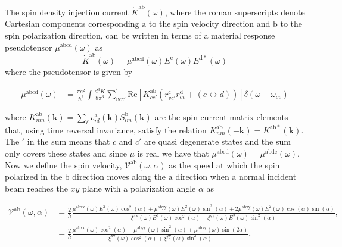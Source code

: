 \documentclass[prb,11pt,tightenlines,twocolumn,aps]{revtex4-1}
\begin{document}
The spin density injection current $\dot{K}^{\mathrm{ab}}(\omega)$, 
% 
{
\color{red}
where the roman superscripts denote Cartesian components corresponding
$\mathrm{a}$ to the spin velocity direction and $\mathrm{b}$ to the spin
polarization direction, can be written in terms of a material response
pseudotensor $\mu^{\mathrm{abcd}}(\omega)$ as }
\begin{equation*}
\dot{K}^{\mathrm{ab}}(\omega) = \mu^{\mathrm{abcd}}(\omega)
E^{\mathrm{c}}(\omega) E^{\mathrm{d*}}(\omega)
\label{eq:dotk}
\end{equation*}
where the pseudotensor is given by\cite{bhatPRL05}
\begin{widetext}
\begin{align}
\mu^{\mathrm{abcd}} (\omega) 
&=
\frac{\pi e^{2}}{\hbar^{2}} \int 
\frac{d^{3}K}{8 \pi^{3}}
\sum_{vcc'}^{'}
\mathrm{Re} \left[ K^{\mathrm{ab}}_{cc'} 
\left( 
r^{\mathrm{c}}_{vc'} 
r^{\mathrm{d}}_{cv } +
(c \leftrightarrow d)
\right) 
\right]
\delta(\omega-\omega_{cv})
\label{eq:mu}
\end{align}
\end{widetext}
{\color{red}
where $K^{\mathrm{ab}}_{mn}(\mathbf{k}) =
\sum_{\ell}v^{\mathrm{a}}_{nl}(\mathbf{k}) S^{\mathrm{b}}_{lm}(\mathbf{k})$ are
the spin current matrix elements that, using time reversal invariance, satisfy
the relation $K^{\mathrm{ab}}_{nm}(\mathbf{-k}) = K^{\mathrm{ab*}}(\mathbf{k})
$. 
}%
The $'$ in the sum means that $c$ and $c'$ are quasi degenerate states and
the sum only covers these states and 
{\color{red}
since $\mu$ is real we have that
$\mu^{\mathrm{abcd}}(\omega) = \mu^{\mathrm{abdc}}(\omega)$.
}
Now we define the spin velocity, $\mathcal{V}^{\mathrm{ab}}(\omega,\alpha)$ as
the speed at which the spin polarized in the $\mathrm{b}$   direction moves
along the $\mathrm{a}$ direction when a normal incident beam reaches the $xy$
plane with a polarization angle $\alpha$ as
\begin{widetext}
\begin{align}
\mathcal{V}^{\mathrm{ab}}(\omega,\alpha)
&= \frac{2}{\hbar}
\frac{\mu^{\mathrm{abxx}}(\omega)
E^{2}(\omega)\cos^{2}(\alpha) + 
\mu^{\mathrm{abyy}}(\omega)
E^{2}(\omega)\sin^{2}(\alpha) + 
2\mu^{\mathrm{abxy}}(\omega)
E^{2}(\omega)\cos(\alpha)\sin(\alpha)}
{\xi^{\mathrm{xx}}(\omega)
E^{2}(\omega)\cos^{2}(\alpha) + 
\xi^{\mathrm{yy}}(\omega)
E^{2}(\omega)\sin^{2}(\alpha)},
\nonumber \\
&= \frac{2}{\hbar}
\frac{\mu^{\mathrm{abxx}}(\omega)\cos^{2}(\alpha) + 
\mu^{\mathrm{abyy}}(\omega)\sin^{2}(\alpha) + 
\mu^{\mathrm{abxy}}(\omega)\sin(2\alpha)}
{\xi^{\mathrm{xx}}(\omega)\cos^{2}(\alpha) + 
\xi^{\mathrm{yy}}(\omega)\sin^{2}(\alpha)},
\label{eq:vab}
\end{align}
\end{widetext}
\end{document}
